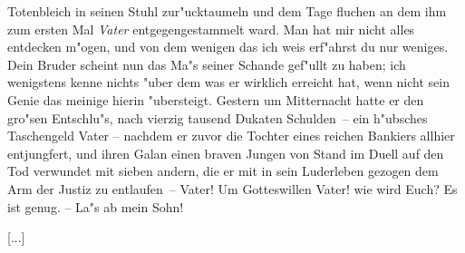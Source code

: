 \begin{drama}
\franspeaks {} \frqq Totenbleich in seinen Stuhl zur"ucktaumeln und dem Tage fluchen an dem ihm zum ersten Mal \emph{Vater} entgegengestammelt ward. Man hat mir nicht alles entdecken m"ogen, und von dem wenigen das ich weis erf"ahrst du nur weniges. Dein Bruder scheint nun das Ma"s seiner Schande gef"ullt zu haben; ich wenigstens kenne nichts "uber dem was er wirklich erreicht hat, wenn nicht sein Genie das meinige hierin "ubersteigt. Gestern um Mitternacht hatte er den gro"sen Entschlu"s, nach vierzig tausend Dukaten Schulden\flqq \ --  ein h"ubsches Taschengeld Vater -- \frqq nachdem er zuvor die Tochter eines reichen Bankiers allhier entjungfert, und ihren Galan einen braven Jungen von Stand im Duell auf den Tod verwundet mit sieben andern, die er mit in sein Luderleben gezogen dem Arm der Justiz zu entlaufen\flqq \ -- Vater! Um Gotteswillen Vater! wie wird Euch?
\moorspeaks Es ist genug. -- La"s ab mein Sohn!

\end{drama}

[...]

\endinput